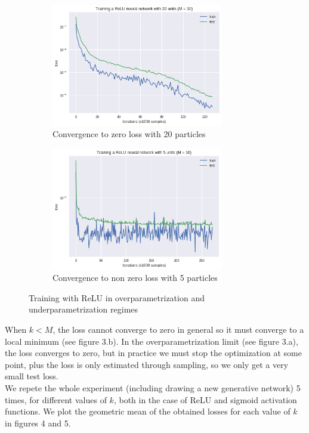 \documentclass[a4paper, 11pt]{scrartcl}
\begin{document}
{\begin{figure}[H]
\centering
\begin{subfigure}{.5\textwidth}
  \centering
  \includegraphics[width=7.5cm]{over.png}
  \caption{Convergence to zero loss with 20 particles}
  \label{fig:sub3}
\end{subfigure}%
\begin{subfigure}{.5\textwidth}
  \centering
  \includegraphics[width=7.5cm]{under.png}
  \caption{Convergence to non zero loss with 5 particles}
  \label{fig:sub4}
\end{subfigure}%
  \caption{Training with ReLU in overparametrization and underparametrization regimes}
\end{figure}


When $k < M$, the loss cannot converge to zero in general so it must converge to a local minimum (see figure 3.b). In the overparametrization limit (see figure 3.a), the loss converges to zero, but in practice we must stop the optimization at some point, plus the loss is only estimated through sampling, so we only get a very small test loss. \\

We repete the whole experiment (including drawing a new generative network) 5 times, for different values of $k$, both in the case of ReLU and sigmoid activation functions. We plot the geometric mean of the obtained losses for each value of $k$ in figures 4 and 5.

}
\end{document}
